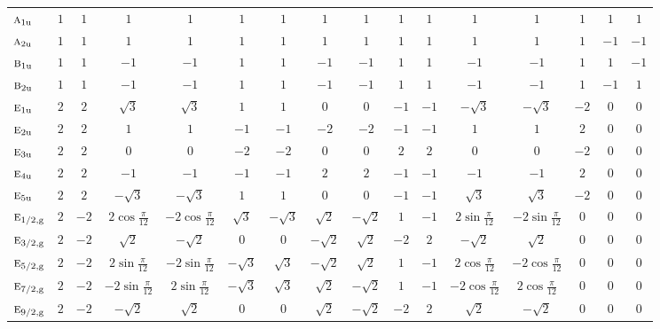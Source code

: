 \documentclass[10pt,a4paper]{article}
\makeatletter
\def\grouprule#1#2{\noalign{\marks\LTgroupmarks{\the\belowrulesep}\nobreak\vskip#1%
  \vskip\aboverulesep}\multispan\LT@cols\unskip{\leaders\hrule\@height#2\hfill\kern\z@}\cr
  \noalign{\penalty\LTrulebreak\vskip\belowrulesep\global\@lastruleclass\z@}}
\numberwithin{equation}{section}
\newcommand{\irr}[1]{\text{\normalfont\scshape #1}}
\newcommand{\ptag}[1]{\mathrm{#1}}
\makeatother
\begin{document}
{{\begin{longtable}{@{}lccccccccccccccc@{}}
$\irr{a}_{1\ptag{u}}$ & $1$ & $1$ & $1$ & $1$ & $1$ & $1$ & $1$ & $1$ & $1$ & $1$ & $1$ & $1$ & $1$ & $1$ & $1$\\
$\irr{a}_{2\ptag{u}}$ & $1$ & $1$ & $1$ & $1$ & $1$ & $1$ & $1$ & $1$ & $1$ & $1$ & $1$ & $1$ & $1$ & $-1$ & $-1$\\
$\irr{b}_{1\ptag{u}}$ & $1$ & $1$ & $-1$ & $-1$ & $1$ & $1$ & $-1$ & $-1$ & $1$ & $1$ & $-1$ & $-1$ & $1$ & $1$ & $-1$\\
$\irr{b}_{2\ptag{u}}$ & $1$ & $1$ & $-1$ & $-1$ & $1$ & $1$ & $-1$ & $-1$ & $1$ & $1$ & $-1$ & $-1$ & $1$ & $-1$ & $1$\\
$\irr{e}_{1\ptag{u}}$ & $2$ & $2$ & $\sqrt{3}$ & $\sqrt{3}$ & $1$ & $1$ & $0$ & $0$ & $-1$ & $-1$ & $-\sqrt{3}$ & $-\sqrt{3}$ & $-2$ & $0$ & $0$\\
$\irr{e}_{2\ptag{u}}$ & $2$ & $2$ & $1$ & $1$ & $-1$ & $-1$ & $-2$ & $-2$ & $-1$ & $-1$ & $1$ & $1$ & $2$ & $0$ & $0$\\
$\irr{e}_{3\ptag{u}}$ & $2$ & $2$ & $0$ & $0$ & $-2$ & $-2$ & $0$ & $0$ & $2$ & $2$ & $0$ & $0$ & $-2$ & $0$ & $0$\\
$\irr{e}_{4\ptag{u}}$ & $2$ & $2$ & $-1$ & $-1$ & $-1$ & $-1$ & $2$ & $2$ & $-1$ & $-1$ & $-1$ & $-1$ & $2$ & $0$ & $0$\\
$\irr{e}_{5\ptag{u}}$ & $2$ & $2$ & $-\sqrt{3}$ & $-\sqrt{3}$ & $1$ & $1$ & $0$ & $0$ & $-1$ & $-1$ & $\sqrt{3}$ & $\sqrt{3}$ & $-2$ & $0$ & $0$\\
\grouprule{0pt}{\lightrulewidth}
$\irr{e}_{1/2,\ptag{g}}$ & $2$ & $-2$ & $2\cos\tfrac{\pi}{12}$ & $-2\cos\tfrac{\pi}{12}$ & $\sqrt{3}$ & $-\sqrt{3}$ & $\sqrt{2}$ & $-\sqrt{2}$ & $1$ & $-1$ & $2\sin\tfrac{\pi}{12}$ & $-2\sin\tfrac{\pi}{12}$ & $0$ & $0$ & $0$\\
$\irr{e}_{3/2,\ptag{g}}$ & $2$ & $-2$ & $\sqrt{2}$ & $-\sqrt{2}$ & $0$ & $0$ & $-\sqrt{2}$ & $\sqrt{2}$ & $-2$ & $2$ & $-\sqrt{2}$ & $\sqrt{2}$ & $0$ & $0$ & $0$\\
$\irr{e}_{5/2,\ptag{g}}$ & $2$ & $-2$ & $2\sin\tfrac{\pi}{12}$ & $-2\sin\tfrac{\pi}{12}$ & $-\sqrt{3}$ & $\sqrt{3}$ & $-\sqrt{2}$ & $\sqrt{2}$ & $1$ & $-1$ & $2\cos\tfrac{\pi}{12}$ & $-2\cos\tfrac{\pi}{12}$ & $0$ & $0$ & $0$\\
$\irr{e}_{7/2,\ptag{g}}$ & $2$ & $-2$ & $-2\sin\tfrac{\pi}{12}$ & $2\sin\tfrac{\pi}{12}$ & $-\sqrt{3}$ & $\sqrt{3}$ & $\sqrt{2}$ & $-\sqrt{2}$ & $1$ & $-1$ & $-2\cos\tfrac{\pi}{12}$ & $2\cos\tfrac{\pi}{12}$ & $0$ & $0$ & $0$\\
$\irr{e}_{9/2,\ptag{g}}$ & $2$ & $-2$ & $-\sqrt{2}$ & $\sqrt{2}$ & $0$ & $0$ & $\sqrt{2}$ & $-\sqrt{2}$ & $-2$ & $2$ & $\sqrt{2}$ & $-\sqrt{2}$ & $0$ & $0$ & $0$\\

\end{longtable}}}
\end{document}
